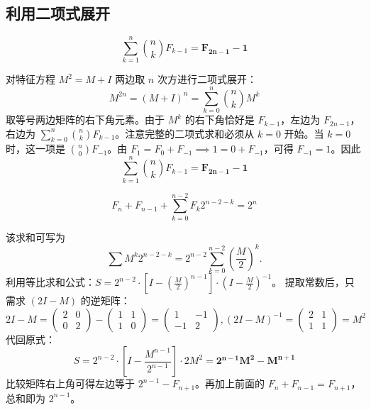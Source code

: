 \subsection{利用二项式展开}
\begin{conclusion}
\[\sum_{k=1}^n \binom{n}{k} F_{k-1} = \mathbf{F_{2n-1} - 1}\]
\end{conclusion}
对特征方程 $M^2 = M+I$ 两边取 $n$ 次方进行二项式展开：
$$ M^{2n} = (M+I)^n = \sum_{k=0}^n \binom{n}{k} M^k $$
取等号两边矩阵的右下角元素。由于 $M^k$ 的右下角恰好是 $F_{k-1}$，左边为 $F_{2n-1}$，右边为 $\sum_{k=0}^n \binom{n}{k} F_{k-1}$。注意完整的二项式求和必须从 $k=0$ 开始。当 $k=0$ 时，这一项是 $\binom{n}{0}F_{-1}$。由 $F_1 = F_0 + F_{-1} \implies 1 = 0 + F_{-1}$，可得 $F_{-1}=1$。因此
\[\sum_{k=1}^n \binom{n}{k} F_{k-1} = \mathbf{F_{2n-1} - 1}\]

\begin{conclusion}
\[F_n + F_{n-1} + \sum_{k=0}^{n-2} F_k 2^{n-2-k} = 2^n\]
\end{conclusion}
该求和可写为
\[
\sum M^k 2^{n-2-k} = 2^{n-2} \sum_{k=0}^{n-2} \left(\frac{M}{2}\right)^k.
\]
利用等比求和公式：$S = 2^{n-2} \cdot [I - (\frac{M}{2})^{n-1}] \cdot (I - \frac{M}{2})^{-1}$。
提取常数后，只需求 $(2I - M)$ 的逆矩阵：
$$ 2I - M = \begin{pmatrix} 2 & 0 \\ 0 & 2 \end{pmatrix} - \begin{pmatrix} 1 & 1 \\ 1 & 0 \end{pmatrix} = \begin{pmatrix} 1 & -1 \\ -1 & 2 \end{pmatrix}, (2I - M)^{-1} = \begin{pmatrix} 2 & 1 \\ 1 & 1 \end{pmatrix}=M^2 $$ 
代回原式：$$ S = 2^{n-2} \cdot \left[I - \frac{M^{n-1}}{2^{n-1}}\right] \cdot 2M^2 = \mathbf{2^{n-1}M^2 - M^{n+1}} $$
比较矩阵右上角可得左边等于 \(2^{n-1}-F_{n+1}\)。再加上前面的 \(F_n+F_{n-1}=F_{n+1}\)，总和即为 \(2^{n-1}\)。

